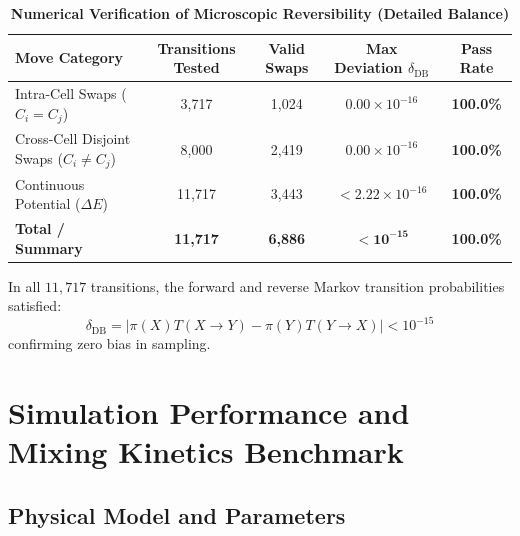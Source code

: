 \documentclass[11pt,a4paper]{article}
\begin{document}
\begin{table}[htbp]
\centering
\small
\caption{\textbf{Numerical Verification of Microscopic Reversibility (Detailed Balance)}}
\label{tab:reversibility_results}
\vspace{0.5em}
\begin{tabular*}{\textwidth}{@{\extracolsep{\fill}}lcccc@{}}
\toprule
\textbf{Move Category} & \textbf{Transitions Tested} & \textbf{Valid Swaps} & \textbf{Max Deviation $\delta_{\text{DB}}$} & \textbf{Pass Rate} \\
\midrule
Intra-Cell Swaps ($C_i = C_j$)       & 3,717  & 1,024 & $0.00 \times 10^{-16}$ & \textbf{100.0\%} \\
Cross-Cell Disjoint Swaps ($C_i \neq C_j$) & 8,000  & 2,419 & $0.00 \times 10^{-16}$ & \textbf{100.0\%} \\
Continuous Potential ($\Delta E$)    & 11,717 & 3,443 & $< 2.22 \times 10^{-16}$ & \textbf{100.0\%} \\
\midrule
\textbf{Total / Summary}             & \textbf{11,717} & \textbf{6,886} & $\mathbf{< 10^{-15}}$ & \textbf{100.0\%} \\
\bottomrule
\end{tabular*}
\end{table}

In all $11,717$ transitions, the forward and reverse Markov transition probabilities satisfied:
\begin{equation}
    \delta_{\text{DB}} = \left| \pi(X) T(X \to Y) - \pi(Y) T(Y \to X) \right| < 10^{-15}
\end{equation}
confirming zero bias in sampling.

\section{Simulation Performance and Mixing Kinetics Benchmark}

\subsection{Physical Model and Parameters}
\end{document}
